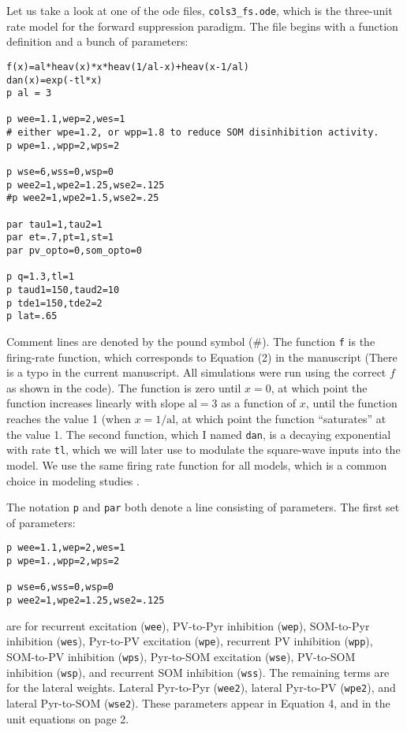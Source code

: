 \documentclass[a4paper,10pt]{article}
\newcommand{\y}[1]{{\texttt{#1}}}
\begin{document}
Let us take a look at one of the ode files, \texttt{cols3\_fs.ode}, which is the three-unit rate model for the forward suppression paradigm. The file begins with a function definition and a bunch of parameters:
\begin{verbatim}
f(x)=al*heav(x)*x*heav(1/al-x)+heav(x-1/al)
dan(x)=exp(-tl*x)
p al = 3

p wee=1.1,wep=2,wes=1
# either wpe=1.2, or wpp=1.8 to reduce SOM disinhibition activity.
p wpe=1.,wpp=2,wps=2

p wse=6,wss=0,wsp=0
p wee2=1,wpe2=1.25,wse2=.125
#p wee2=1,wpe2=1.5,wse2=.25

par tau1=1,tau2=1
par et=.7,pt=1,st=1
par pv_opto=0,som_opto=0

p q=1.3,tl=1
p taud1=150,taud2=10
p tde1=150,tde2=2
p lat=.65
\end{verbatim}
Comment lines are denoted by the pound symbol (\#). The function \texttt{f} is the firing-rate function, which corresponds to Equation (2) in the manuscript (There is a typo in the current manuscript. All simulations were run using the correct $f$ as shown in the code). The function is zero until $x=0$, at which point the function increases linearly with slope $\text{al}=3$ as a function of $x$, until the function reaches the value 1 (when $x=1/\text{al}$, at which point the function ``saturates'' at the value 1. The second function, which I named \y{dan}, is a decaying exponential with rate \y{tl}, which we will later use to modulate the square-wave inputs into the model. We use the same firing rate function for all models, which is a common choice in modeling studies \cite{natan2015complementary,yarden2017stimulus}.

The notation \texttt{p} and \texttt{par} both denote a line consisting of parameters. The first set of parameters:
\begin{verbatim}
p wee=1.1,wep=2,wes=1
p wpe=1.,wpp=2,wps=2

p wse=6,wss=0,wsp=0
p wee2=1,wpe2=1.25,wse2=.125
\end{verbatim}
are for recurrent excitation (\texttt{wee}), PV-to-Pyr inhibition (\texttt{wep}), SOM-to-Pyr inhibition (\texttt{wes}), Pyr-to-PV excitation (\texttt{wpe}), recurrent PV inhibition (\y{wpp}), SOM-to-PV inhibition (\y{wps}), Pyr-to-SOM excitation (\y{wse}), PV-to-SOM inhibition (\y{wsp}), and recurrent SOM inhibition (\y{wss}). The remaining terms are for the lateral weights. Lateral Pyr-to-Pyr (\y{wee2}), lateral Pyr-to-PV (\y{wpe2}), and lateral Pyr-to-SOM (\y{wse2}). These parameters appear in Equation 4, and in the unit equations on page 2.
\end{document}
